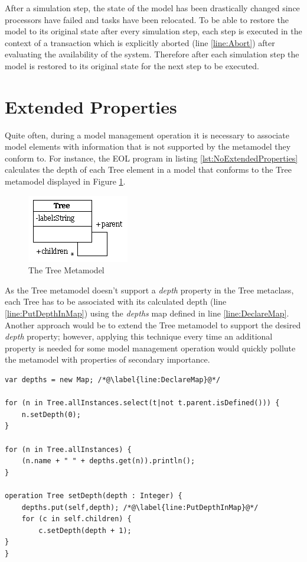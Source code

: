 After a simulation step, the state of the model has been drastically changed since processors have failed and tasks have been relocated. To be able to restore the model to its original state after every simulation step, each step is executed in the context of a transaction which is explicitly aborted (line \ref{line:Abort}) after evaluating the availability of the system. Therefore after each simulation step the model is restored to its original state for the next step to be executed.



\section{Extended Properties}
\label{sec:ExtendedProperties}

Quite often, during a model management operation it is necessary to associate model elements with information that is not supported by the metamodel they conform to. For instance, the EOL program in listing \ref{lst:NoExtendedProperties} calculates the depth of each Tree element in a model that conforms to the Tree metamodel displayed in Figure \ref{fig:Tree1}.

\begin{figure}[t!]
	\centering
		\includegraphics{images/metamodels/Tree.png}
	\caption{The Tree Metamodel}
	\label{fig:Tree1}
\end{figure}

As the Tree metamodel doesn't support a \emph{depth} property in the Tree metaclass, each Tree has to be associated with its calculated depth (line \ref{line:PutDepthInMap}) using the \emph{depths} map defined in line \ref{line:DeclareMap}. Another approach would be to extend the Tree metamodel to support the desired \emph{depth} property; however, applying this technique every time an additional property is needed for some model management operation would quickly pollute the metamodel with properties of secondary importance.

\begin{lstlisting}[float=h, caption=Calculating and printing the depth of each Tree, label=lst:NoExtendedProperties, language=EOL]
var depths = new Map; /*@\label{line:DeclareMap}@*/

for (n in Tree.allInstances.select(t|not t.parent.isDefined())) {
    n.setDepth(0);
}

for (n in Tree.allInstances) {
    (n.name + " " + depths.get(n)).println();
}

operation Tree setDepth(depth : Integer) {
    depths.put(self,depth); /*@\label{line:PutDepthInMap}@*/
    for (c in self.children) {
        c.setDepth(depth + 1);
}
}
\end{lstlisting}

